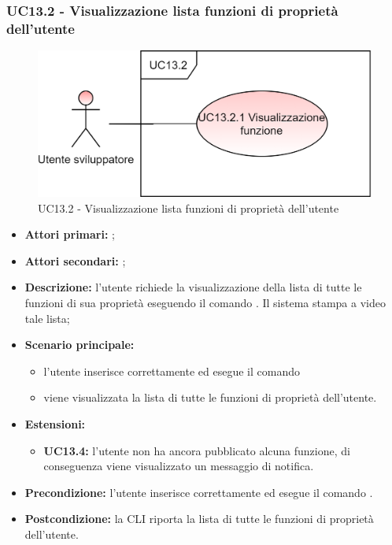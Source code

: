 \subsubsection{UC13.2 - Visualizzazione lista funzioni di proprietà dell’utente}
\begin{figure}[h]
	\centering
	\includegraphics[scale=\ucs]{./res/img/UC13.2.png}
	\caption {UC13.2 - Visualizzazione lista funzioni di proprietà dell’utente}
\end{figure}
\begin{itemize}
	\item \textbf{Attori primari:} \us{};
	\item \textbf{Attori secondari:} \re{};
	\item \textbf{Descrizione:} l’utente richiede la visualizzazione della lista di tutte le funzioni di sua proprietà eseguendo il comando \plista{}. Il sistema stampa a video tale lista;
	\item \textbf{Scenario principale:} 
	\begin{itemize}
		\item l’utente inserisce correttamente ed esegue il comando \plista{}  
		\item viene visualizzata la lista di tutte le funzioni di proprietà dell’utente. 
	\end{itemize}
	\item \textbf{Estensioni:} 
	\begin{itemize}
		\item \textbf{UC13.4:} l’utente non ha ancora pubblicato alcuna funzione, di conseguenza viene visualizzato un messaggio di notifica. 
	\end{itemize}
	\item \textbf{Precondizione:} l'utente inserisce correttamente ed esegue il comando \plista{}.
	\item \textbf{Postcondizione:} la CLI riporta la lista di tutte le funzioni di proprietà dell’utente. 
\end{itemize}